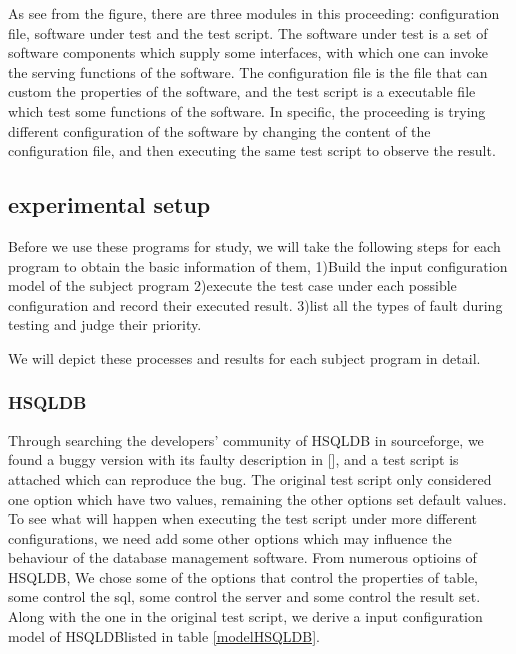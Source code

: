 \documentclass[10pt,journal,cspaper,compsoc]{IEEEtran}
\begin{document}
As see from the figure, there are three modules in this proceeding: configuration file, software under test and the test script. The software under test is a set of software components which supply some interfaces, with which one can invoke the serving functions of the software. The configuration file is the file that can custom the properties of the software, and the test script is a executable file which test some functions of the software. In specific, the proceeding is trying different configuration of the software by changing the content of the configuration file, and then executing the same test script to observe the result.

\subsection{experimental setup}
Before we use these programs for study, we will take the following steps for each program to obtain the basic information of them, 1)Build the input configuration model of the subject program 2)execute the test case under each possible configuration and record their executed result. 3)list all the types of fault during testing and judge their priority.

We will depict these processes and results for each subject program in detail.
\subsubsection{HSQLDB}
Through searching the developers' community of HSQLDB in sourceforge, we found a buggy version with its faulty description in [], and a test script is attached which can reproduce the bug. The original test script only considered one option which have two values, remaining the other options set default values. To see what will happen when executing the test script under more different configurations, we need add some other options which may influence the behaviour of the database management software. From numerous optioins of HSQLDB, We chose some of the options that control the properties of table, some control the sql, some control the server and some control the result set. Along with the one in the original test script, we derive a input configuration model of HSQLDBlisted in table \ref{modelHSQLDB}.
\end{document}
